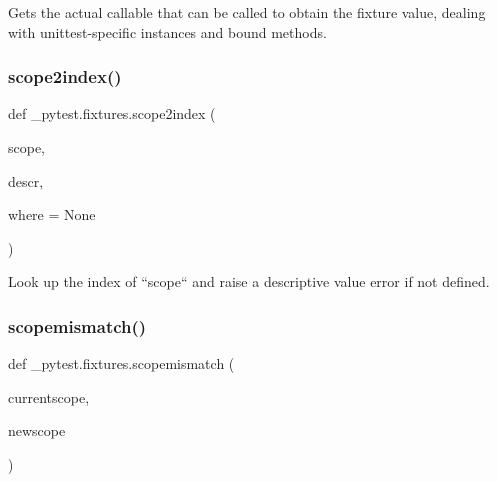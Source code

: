\begin{DoxyVerb}Gets the actual callable that can be called to obtain the fixture value, dealing with unittest-specific
instances and bound methods.
\end{DoxyVerb}
 \mbox{\label{namespace__pytest_1_1fixtures_a819d1c10ac18ab8e0b5a879fad486139}} 
\subsubsection{\texorpdfstring{scope2index()}{scope2index()}}
{\footnotesize\ttfamily def \+\_\+pytest.\+fixtures.\+scope2index (\begin{DoxyParamCaption}\item[{}]{scope,  }\item[{}]{descr,  }\item[{}]{where = {\ttfamily None} }\end{DoxyParamCaption})}

\begin{DoxyVerb}Look up the index of ``scope`` and raise a descriptive value error
if not defined.
\end{DoxyVerb}
 \mbox{\label{namespace__pytest_1_1fixtures_a93accbaf2095e10285b690f2b1de6d73}} 
\subsubsection{\texorpdfstring{scopemismatch()}{scopemismatch()}}
{\footnotesize\ttfamily def \+\_\+pytest.\+fixtures.\+scopemismatch (\begin{DoxyParamCaption}\item[{}]{currentscope,  }\item[{}]{newscope }\end{DoxyParamCaption})}

\mbox{\label{namespace__pytest_1_1fixtures_a1b3d6eac66174544e16dfd62cc0f77fa}} 
